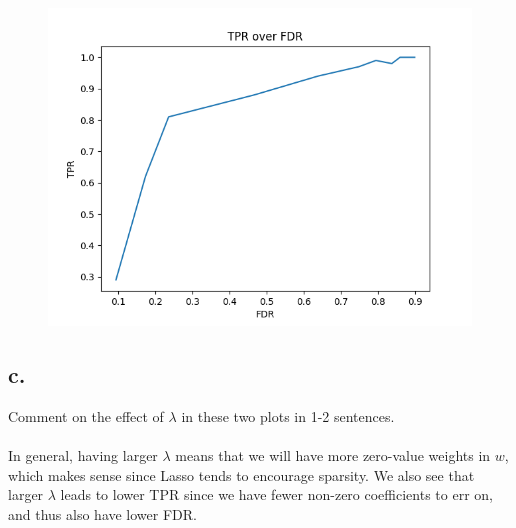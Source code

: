 \documentclass{article}
\newcommand{\1}{\mathbf{1}}
\begin{document}
{\begin{figure}[ht!]
  \centering
  \includegraphics[width=150mm]{../hw2-code/results/a4_b.png}
\end{figure}

\subsection*{c.}

Comment on the effect of $\lambda$ in these two plots in 1-2 sentences. \\ \\
In general, having larger $\lambda$ means that we will have more zero-value weights in $w$, which makes sense since Lasso tends to encourage sparsity. We also see that larger $\lambda$ leads to lower TPR since we have fewer non-zero coefficients to err on, and thus also have lower FDR.

}
\end{document}
